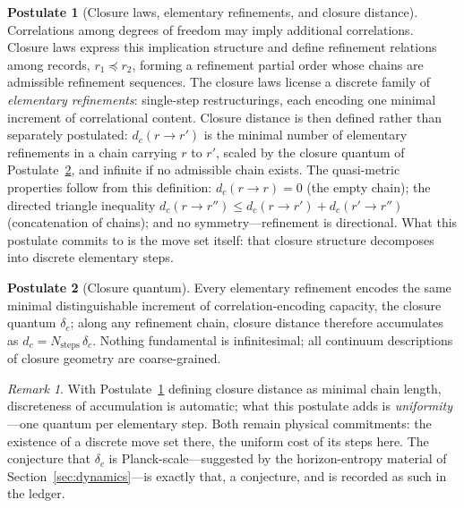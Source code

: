 \documentclass[11pt]{article}
\theoremstyle{definition}
\newtheorem{postulate}{Postulate}
\theoremstyle{remark}
\newtheorem{remark}{Remark}
\begin{document}
\begin{postulate}[Closure laws, elementary refinements, and closure distance]\label{post:closure}
Correlations among degrees of freedom may imply additional correlations. Closure laws express this implication structure and define refinement relations among records, $r_1 \preceq r_2$, forming a refinement partial order whose chains are admissible refinement sequences. The closure laws license a discrete family of \emph{elementary refinements}: single-step restructurings, each encoding one minimal increment of correlational content. Closure distance is then defined rather than separately postulated: $d_c(r \to r')$ is the minimal number of elementary refinements in a chain carrying $r$ to $r'$, scaled by the closure quantum of Postulate~\ref{post:quantum}, and infinite if no admissible chain exists. The quasi-metric properties follow from this definition: $d_c(r \to r) = 0$ (the empty chain); the directed triangle inequality $d_c(r \to r'') \le d_c(r \to r') + d_c(r' \to r'')$ (concatenation of chains); and no symmetry---refinement is directional. What this postulate commits to is the move set itself: that closure structure decomposes into discrete elementary steps.
\end{postulate}

\begin{postulate}[Closure quantum]\label{post:quantum}
Every elementary refinement encodes the same minimal distinguishable increment of correlation-encoding capacity, the closure quantum $\delta_c$; along any refinement chain, closure distance therefore accumulates as $d_c = N_{\mathrm{steps}}\,\delta_c$. Nothing fundamental is infinitesimal; all continuum descriptions of closure geometry are coarse-grained.
\end{postulate}

\begin{remark}
With Postulate~\ref{post:closure} defining closure distance as minimal chain length, discreteness of accumulation is automatic; what this postulate adds is \emph{uniformity}---one quantum per elementary step. Both remain physical commitments: the existence of a discrete move set there, the uniform cost of its steps here. The conjecture that $\delta_c$ is Planck-scale---suggested by the horizon-entropy material of Section~\ref{sec:dynamics}---is exactly that, a conjecture, and is recorded as such in the ledger.
\end{remark}
\end{document}
